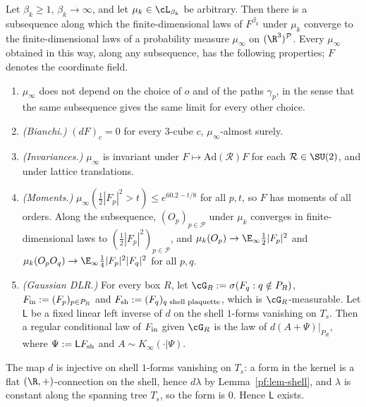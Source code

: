 \begin{proposition}[L4]\label{pf:prop-L4}
Let $\beta_k\ge1$, $\beta_k\to\infty$, and let $\mu_k\in\cL_{\beta_k}$ be arbitrary. Then there is a subsequence along which the finite-dimensional laws of $F^{\beta_k}$ under $\mu_k$ converge to the finite-dimensional laws of a probability measure $\mu_\infty$ on $(\R^3)^{\mathcal P}$. Every $\mu_\infty$ obtained in this way, along any subsequence, has the following properties; $F$ denotes the coordinate field.
\begin{enumerate}
\item[(a)] $\mu_\infty$ does not depend on the choice of $o$ and of the paths $\gamma_p$, in the sense that the same subsequence gives the same limit for every other choice.
\item[(b)] \emph{(Bianchi.)} $(dF)_c=0$ for every $3$-cube $c$, $\mu_\infty$-almost surely.
\item[(c)] \emph{(Invariances.)} $\mu_\infty$ is invariant under $F\mapsto\mathrm{Ad}(\mathcal R)F$ for each $\mathcal R\in\SU(2)$, and under lattice translations.
\item[(d)] \emph{(Moments.)} $\mu_\infty(\tfrac12|F_p|^2>t)\le e^{60.2-t/8}$ for all $p,t$, so $F$ has moments of all orders. Along the subsequence, $(O_p)_{p\in\mathcal P}$ under $\mu_k$ converges in finite-dimensional laws to $(\tfrac12|F_p|^2)_{p\in\mathcal P}$, and $\mu_k(O_p)\to\E_\infty\tfrac12|F_p|^2$ and $\mu_k(O_pO_q)\to\E_\infty\tfrac14|F_p|^2|F_q|^2$ for all $p,q$.
\item[(e)] \emph{(Gaussian DLR.)} For every box $R$, let $\cG_R:=\sigma(F_q:q\notin P_R)$, $F_{\rm in}:=(F_p)_{p\in P_R}$ and $F_{\rm sh}:=(F_q)_{q\text{ shell plaquette}}$, which is $\cG_R$-measurable. Let $\mathsf L$ be a fixed linear left inverse of $d$ on the shell $1$-forms vanishing on $T_s$. Then a regular conditional law of $F_{\rm in}$ given $\cG_R$ is the law of $d(A+\Psi)|_{P_R}$, where $\Psi:=\mathsf LF_{\rm sh}$ and $A\sim K_\infty(\cdot|\Psi)$.
\end{enumerate}
\end{proposition}

The map $d$ is injective on shell $1$-forms vanishing on $T_s$: a form in the kernel is a flat $(\R,+)$-connection on the shell, hence $d\lambda$ by Lemma~\ref{pf:lem-shell}, and $\lambda$ is constant along the spanning tree $T_s$, so the form is $0$. Hence $\mathsf L$ exists.

